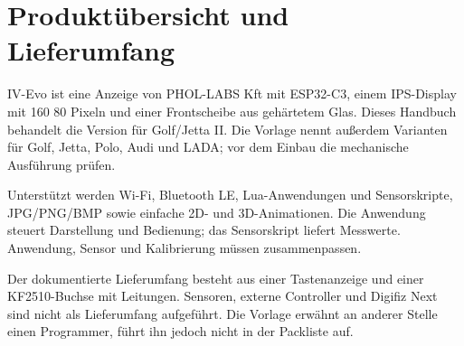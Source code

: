 \chapter{Produktübersicht und Lieferumfang}
IV-Evo ist eine Anzeige von PHOL-LABS Kft mit ESP32-C3, einem IPS-Display mit 160\,\texttimes\,80 Pixeln und einer Frontscheibe aus gehärtetem Glas. Dieses Handbuch behandelt die Version für Golf/Jetta II. Die Vorlage nennt außerdem Varianten für Golf, Jetta, Polo, Audi und LADA; vor dem Einbau die mechanische Ausführung prüfen.

Unterstützt werden Wi-Fi, Bluetooth LE, Lua-Anwendungen und Sensorskripte, JPG/PNG/BMP sowie einfache 2D- und 3D-Animationen. Die Anwendung steuert Darstellung und Bedienung; das Sensorskript liefert Messwerte. Anwendung, Sensor und Kalibrierung müssen zusammenpassen.

Der dokumentierte Lieferumfang besteht aus einer Tastenanzeige und einer KF2510-Buchse mit Leitungen. Sensoren, externe Controller und Digifiz Next sind nicht als Lieferumfang aufgeführt. Die Vorlage erwähnt an anderer Stelle einen Programmer, führt ihn jedoch nicht in der Packliste auf.
